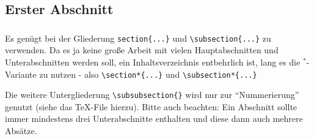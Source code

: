 \thispagestyle{empty}
\begin{abstract}
Hier sollte eine eine kurze Zusammenfassung des Inhalts des Vortrags oder der Hausarbeit stehen.
Dazu dieses \TeX{}-File kopieren und umbenennen.
Weitergehende Literatur ist im  Literatur\-verzeichnis aufgeführt, wobei ich das Buch von \textsc{Voss} \cite{voss-wiss} empfehlen kann.
Für einen Einstieg empfehle ich \emph{l2kurz.pdf}, das man auf 
%
\begin{center}
\texttt{http://mirror.ctan.org/info/lshort/german/} 
\end{center}
%
findet.
Dieses ist als Kurzeinführung gut geeignet, verwendet aber die üblichen Dokumentklassen von \LaTeX{} und nicht die besser geeigneten von `KOMA-Script`.
Weiteres in meinem Erläuterungen \emph{Sem-ReadMe.md}.
Ein Teil der hier angegeben Literatur und weiteres findet sich auf ILIAS \bzw in dem \og PDF.
\end{abstract}
%
\subsection{Erster Abschnitt}\label{sec:erster-abschnitt}
\subsubsection{}
Es genügt bei der Gliederung \verb|section{...}| und \verb|\subsection{...}| zu verwenden.
Da es ja keine große Arbeit mit vielen Hauptabschnitten und Unterabschnitten werden soll, \dh ein Inhaltsverzeichnis entbehrlich ist, lang es die  $ ^{*} $-Variante zu nutzen - also \verb|\section*{...}| und \verb|\subsection*{...}|

Die weitere Untergliederung \verb|\subsubsection{}| wird nur zur \enquote{Nummerierung} genutzt (siehe das \TeX{}-File hierzu).
Bitte auch beachten: Ein Abschnitt sollte immer mindestens drei Unterabschnitte enthalten und diese dann auch mehrere Absätze. 

